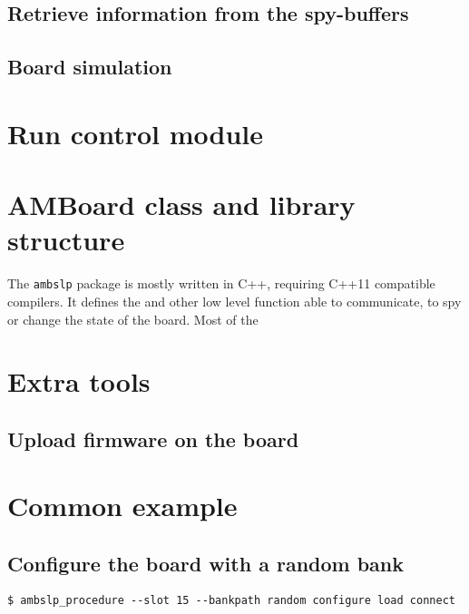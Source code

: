 \documentclass[UKenglish]{latex/atlasdoc}
\begin{document}
\subsection{Retrieve information from the spy-buffers}


\subsection{Board simulation}


\section{Run control module}



\section{AMBoard class and library structure}
\label{sec:library}

The \texttt{ambslp} package is mostly written in C++, requiring C++11 
compatible compilers. It defines the \textbf{\AMBoard}  and other low
level function able to communicate, to spy or change the state of the board.
Most of the 

\section{Extra tools}

\subsection{Upload firmware on the board}



\appendix
\section{Common example}
\subsection{Configure the board with a random bank}

\begin{verbatim}
$ ambslp_procedure --slot 15 --bankpath random configure load connect
\end{verbatim}

\printindex
\end{document}
